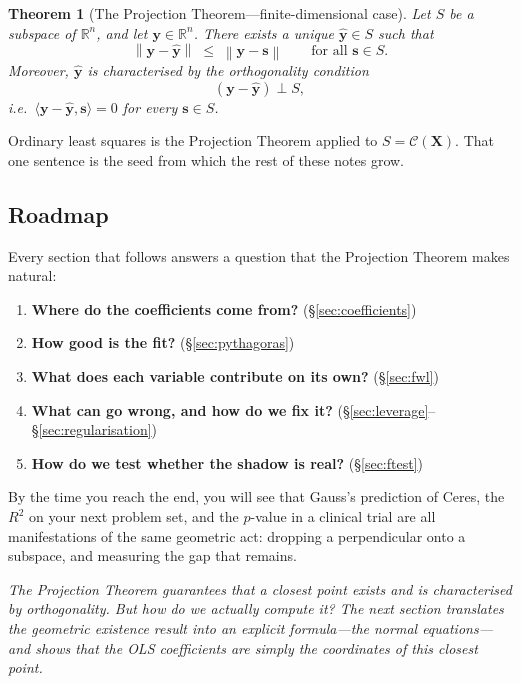 \documentclass[11pt,a4paper]{article}
\theoremstyle{plain}
\newtheorem{theorem}{Theorem}[section]
\theoremstyle{definition}
\newcommand{\R}{\mathbb{R}}
\newcommand{\yhat}{\hat{\bm{y}}}
\newcommand{\bX}{\bm{X}}
\newcommand{\by}{\bm{y}}
\newcommand{\Col}{\mathcal{C}}
\newcommand{\ip}[2]{\langle #1, #2 \rangle}
\newcommand{\norm}[1]{\left\lVert #1 \right\rVert}
\begin{document}
\begin{theorem}[The Projection Theorem---finite-dimensional case]%
  \label{thm:projection}
Let $S$ be a subspace of $\R^n$, and let $\by\in \R^n$.  There exists
a unique $\yhat\in S$ such that
\[
  \norm{\by - \yhat} \;\le\; \norm{\by - \bm{s}}
  \qquad\text{for all } \bm{s}\in S.
\]
Moreover, $\yhat$ is characterised by the \emph{orthogonality condition}
\[
  (\by - \yhat) \perp S,
\]
i.e.\ $\ip{\by - \yhat}{\bm{s}} = 0$ for every $\bm{s}\in S$.
\end{theorem}

Ordinary least squares is the Projection Theorem applied to
$S = \Col(\bX)$.
That one sentence is the seed from which the rest of these notes grow.

\subsection*{Roadmap}

Every section that follows answers a question that the Projection
Theorem makes natural:

\begin{enumerate}[leftmargin=2em]
  \item \textbf{Where do the coefficients come from?}
    (\S\ref{sec:coefficients})

  \item \textbf{How good is the fit?}
    (\S\ref{sec:pythagoras})

  \item \textbf{What does each variable contribute on its own?}
    (\S\ref{sec:fwl})

  \item \textbf{What can go wrong, and how do we fix it?}
    (\S\ref{sec:leverage}--\S\ref{sec:regularisation})

  \item \textbf{How do we test whether the shadow is real?}
    (\S\ref{sec:ftest})
\end{enumerate}

\noindent
By the time you reach the end, you will see that Gauss's prediction of
Ceres, the $R^2$ on your next problem set, and the $p$-value in a
clinical trial are all manifestations of the same geometric act:
dropping a perpendicular onto a subspace, and measuring the gap that
remains.

\medskip
\noindent\textit{The Projection Theorem guarantees that a closest point
exists and is characterised by orthogonality.
But how do we actually \emph{compute} it?
The next section translates the geometric existence result into an
explicit formula---the normal equations---and shows that the OLS
coefficients are simply the coordinates of this closest point.}
\end{document}
